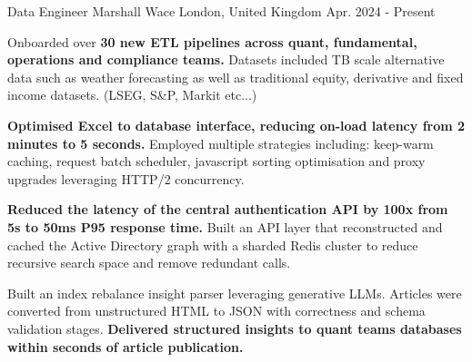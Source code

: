 

\begin{cventries}

  \cventry
    {Data Engineer} %
    {Marshall Wace} %
    {London, United Kingdom} %
    {Apr. 2024 - Present} %
    {
      \begin{cvitems} %
        \item {Onboarded over \textbf{30 new ETL pipelines across quant, fundamental, operations and compliance teams.} Datasets included TB scale alternative data such as weather forecasting as well as traditional equity, derivative and fixed income datasets. (LSEG, S\&P, Markit etc...)}
        \item {\textbf{Optimised Excel to database interface, reducing on-load latency from 2 minutes to 5 seconds.} Employed multiple strategies including: keep-warm caching, request batch scheduler, javascript sorting optimisation and proxy upgrades leveraging HTTP/2 concurrency.}
        \item {\textbf{Reduced the latency of the central authentication API by 100x from 5s to 50ms P95 response time.} Built an API layer that reconstructed and cached the Active Directory graph with a sharded Redis cluster to reduce recursive search space and remove redundant calls.}
        \item {Built an index rebalance insight parser leveraging generative LLMs. Articles were converted from unstructured HTML to JSON with correctness and schema validation stages. \textbf{Delivered structured insights to quant teams databases within seconds of article publication.}}
      \end{cvitems}
    }


\end{cventries}
